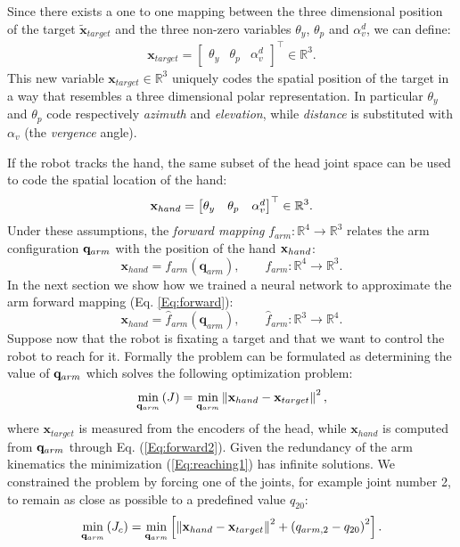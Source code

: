 %
Since there exists a one to one mapping between the three dimensional 
position of the target 
$\tilde {\mathbf x}_{target}$ and the three non-zero variables 
$\theta_y$, $\theta_p$ and $\alpha_v^d$, we can define:
%
\begin{eqnarray}
\mathbf x_{target}=
\begin{bmatrix} \theta_y & \theta_p & \alpha_v^d\end{bmatrix}^\top \in \mathbb R^3.
\end{eqnarray}
%
This new variable $\mathbf x_{target} \in \mathbb R^3$ uniquely codes the 
spatial position of the target in a way that resembles a three dimensional 
polar representation. In particular $\theta_y$ and $\theta_p$ code 
respectively \emph{azimuth} and \emph{elevation}, while \emph{distance} is 
substituted with $\alpha_v$ (the \emph{vergence} angle). 

If the robot tracks the hand, the same subset of the head joint space 
can be used to code the spatial location of the hand:
%
\begin{eqnarray*}
\mathbf{x}_{hand}=
\begin{bmatrix} \theta_y & \theta_p & \alpha_v^d\end{bmatrix}^\top \in \mathbb R^3.
\end{eqnarray*}
%
Under these assumptions, the \emph{forward mapping} 
$f_{arm} : \mathbb R^4 \longrightarrow \mathbb R^3$
relates the arm configuration $\mathbf q_{arm}$ with the position of the hand 
$\mathbf{x}_{hand}$:
%
\begin{equation} 
\label{Eq:forward}
\mathbf x_{hand}=f_{arm}(\mathbf q_{arm}), \qquad f_{arm} : \mathbb R^4 \longrightarrow \mathbb R^3.\end{equation}
%
In the next section we show how we trained a neural network to approximate
the arm forward mapping (Eq. \ref{Eq:forward}): 
%
\begin{equation} 
\label{Eq:forward2}
\mathbf x_{hand}=\hat{f}_{arm}(\mathbf q_{arm}), \qquad \hat{f}_{arm} : \mathbb R^3 \longrightarrow \mathbb R^4.\end{equation}
%
Suppose now that the robot is fixating a target and that we want to control 
the robot to reach for it. Formally the problem can be formulated 
as determining the value of $\mathbf q_{arm}$ which solves the 
following optimization problem:
%
\begin{equation} 
\label{Eq:reaching1}
  \displaystyle\min_{\mathbf q_{arm}} \left(J\right)=\displaystyle\min_{\mathbf q_{arm}}
  \left\|\mathbf x_{hand} - \mathbf x_{target}\right\|^2,
\end{equation}
%
where $\mathbf x_{target}$ is measured from the encoders of the head, while 
$\mathbf x_{hand}$ is computed from $\mathbf q_{arm}$ through Eq. (\ref{Eq:forward2}).
Given the redundancy of the arm kinematics the minimization 
(\ref{Eq:reaching1}) has infinite solutions. We constrained the problem by 
forcing one of the joints, for example joint number 2, to remain as close 
as possible to a predefined value $q_{20}$:
%
\begin{equation} 
\label{Eq:reaching2}
  \displaystyle\min_{\mathbf q_{arm}}\left(J_c\right)=\displaystyle\min_{\mathbf q_{arm}}
  \left[
  \left\|\mathbf x_{hand} - \mathbf x_{target}\right\|^2 + \left(q_{arm,2}-q_{20}\right)^2
  \right].
\end{equation}

